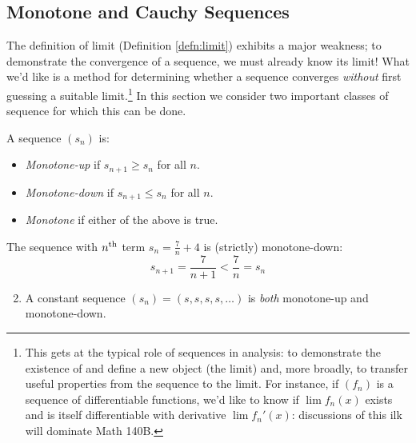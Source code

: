 \clearpage



\subsection{Monotone and Cauchy Sequences}\label{sec:monocauchy}

The definition of limit (Definition \ref{defn:limit}) exhibits a major weakness; to demonstrate the convergence of a sequence, we must already know its limit! What we'd like is a method for determining whether a sequence converges \emph{without} first guessing a suitable limit.\footnote{This gets at the typical role of sequences in analysis: to demonstrate the existence of and define a new object (the limit) and, more broadly, to transfer useful properties from the sequence to the limit. For instance, if $(f_n)$ is a sequence of differentiable functions, we'd like to know if $\lim f_n(x)$ exists and is itself differentiable with derivative $\lim f_n'(x)$: discussions of this ilk will dominate Math 140B.} In this section we consider two important classes of sequence for which this can be done.

\begin{defn}{}{}
	A sequence $(s_n)$ is:
	\begin{itemize}
	  \item \emph{Monotone-up\footnotemark} if $s_{n+1}\ge s_n$ for all $n$.
		\item \emph{Monotone-down} if $s_{n+1}\le s_n$ for all $n$.
		\item \emph{Monotone} if either of the above is true.
	\end{itemize}
\end{defn}


\begin{examples}{}{}
	\exstart The sequence with $n\textsuperscript{th}$ term $s_n=\frac 7n+4$ is (strictly) monotone-down:
	\[s_{n+1}=\frac 7{n+1}<\frac 7n=s_n\]
	\begin{enumerate}\setcounter{enumi}{1}
	  \item A constant sequence $(s_n)=(s,s,s,s,\ldots)$ is \emph{both} monotone-up and monotone-down.
	\end{enumerate}
\end{examples}



